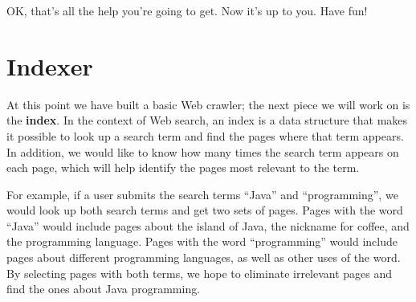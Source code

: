 \documentclass[12pt]{book}
\theoremstyle{exercise}
\newcommand{\java}{\verb}%}
\begin{document}

OK, that's all the help you're going to get. Now it's up to you.
Have fun!



\chapter{Indexer}

At this point we have built a basic Web crawler; the next piece we will
work on is the \textbf{index}. In the context of Web search, an index is
a data structure that makes it possible to look up a search term and
find the pages where that term appears. In addition, we would like to
know how many times the search term appears on each page, which will
help identify the pages most relevant to the term.

For example, if a user submits the search terms ``Java'' and
``programming'', we would look up both search terms and get two sets of
pages. Pages with the word ``Java'' would include pages about the island
of Java, the nickname for coffee, and the programming language. Pages
with the word ``programming'' would include pages about different
programming languages, as well as other uses of the word. By selecting
pages with both terms, we hope to eliminate irrelevant pages and find
the ones about Java programming.
\end{document}
